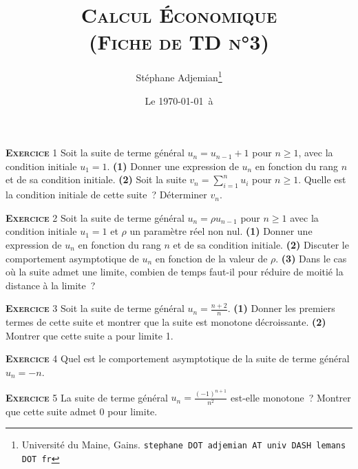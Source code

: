 \documentclass[10pt,a4paper,notitlepage]{article}
\newcommand{\exercice}[1]{\textsc{\textbf{Exercice}} #1}
\begin{document}
\title{\textsc{Calcul Économique\\ \small{(Fiche de TD n°3)}}}
\author{Stéphane Adjemian\thanks{Université du Maine, Gains. \texttt{stephane DOT adjemian AT univ DASH lemans DOT fr}}}
\date{Le \today\ à \thistime}

\maketitle

\exercice{1} Soit la suite de terme général $u_n = u_{n-1} + 1$ pour
$n \geq 1$, avec la condition initiale $u_1 = 1$. \textbf{(1)} Donner
une expression de $u_n$ en fonction du rang $n$ et de sa condition
initiale. \textbf{(2)} Soit la suite $v_n = \sum_{i=1}^n u_i$ pour
$n\geq 1$. Quelle est la condition initiale de cette suite ?
Déterminer $v_n$.

\bigskip

\exercice{2} Soit la suite de terme général $u_n = \rho u_{n-1}$ pour
$n \geq 1$ avec la condition initiale $u_1 = 1$ et $\rho$ un paramètre
réel non nul. \textbf{(1)} Donner une expression de $u_n$ en fonction
du rang $n$ et de sa condition initiale. \textbf{(2)} Discuter le
comportement asymptotique de $u_n$ en fonction de la valeur de
$\rho$. \textbf{(3)} Dans le cas où la suite admet une limite, combien
de temps faut-il pour réduire de moitié la distance à la limite ?

\bigskip

\exercice{3} Soit la suite de terme général $u_n =
\frac{n+2}{n}$. \textbf{(1)} Donner les premiers termes de cette suite
et montrer que la suite est monotone décroissante. \textbf{(2)}
Montrer que cette suite a pour limite 1.

\bigskip

\exercice{4} Quel est le comportement asymptotique de la suite de
terme général $u_n = -n$.

\bigskip

\exercice{5} La suite de terme général $u_n = \frac{(-1)^{n+1}}{n^2}$
est-elle monotone ? Montrer que cette suite admet 0 pour limite.

\bigskip
\end{document}
